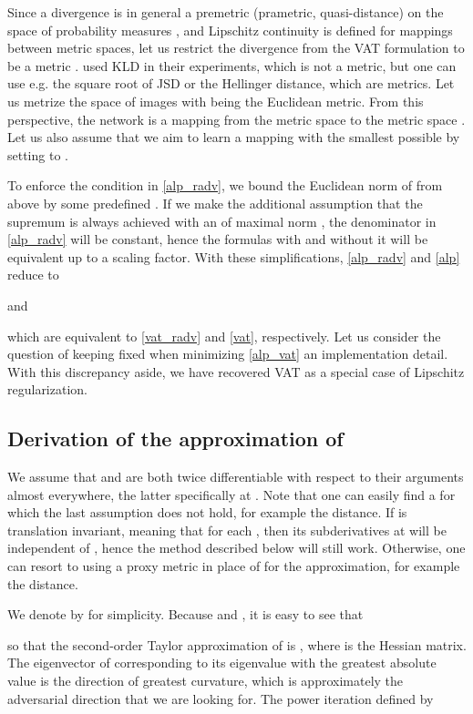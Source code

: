 \documentclass{article}
\begin{document}
Since a divergence is in general a premetric (prametric, quasi-distance) on the space of probability measures \citep{Deza2009}, and Lipschitz continuity is defined for mappings between metric spaces, let us restrict the divergence  from the VAT formulation to be a metric . \citet{Miyatoetal2017} used KLD in their experiments, which is not a metric, but one can use e.g. the square root of JSD or the Hellinger distance, which are metrics. Let us metrize the space of images  with  being the Euclidean metric. From this perspective, the network  is a mapping from the metric space  to the metric space . Let us also assume that we aim to learn a mapping  with the smallest possible  by setting  to .

To enforce the condition  in \eqref{alp_radv}, we bound the Euclidean norm of  from above by some predefined . If we make the additional assumption that the supremum is always achieved with an  of maximal norm , the denominator in \eqref{alp_radv} will be constant, hence the formulas with and without it will be equivalent up to a scaling factor. With these simplifications, \eqref{alp_radv} and \eqref{alp} reduce to 

and

which are equivalent to \eqref{vat_radv} and \eqref{vat}, respectively. Let us consider the question of keeping  fixed when minimizing \eqref{alp_vat} an implementation detail. With this discrepancy aside, we have recovered VAT as a special case of Lipschitz regularization.

\subsection{Derivation of the approximation of } \label{r_adv_derivation}
We assume that  and  are both twice differentiable with respect to their arguments almost everywhere, the latter specifically at . Note that one can easily find a  for which the last assumption does not hold, for example the  distance. If  is translation invariant, meaning that  for each , then its subderivatives at  will be independent of , hence the method described below will still work. Otherwise, one can resort to using a proxy metric in place of  for the approximation, for example the  distance.

We denote  by  for simplicity. Because  and , it is easy to see that

so that the second-order Taylor approximation of  is , where  is the Hessian matrix. The eigenvector  of  corresponding to its eigenvalue with the greatest absolute value is the direction of greatest curvature, which is approximately the adversarial direction that we are looking for. The power iteration \citep{Householder1964} defined by
\end{document}
